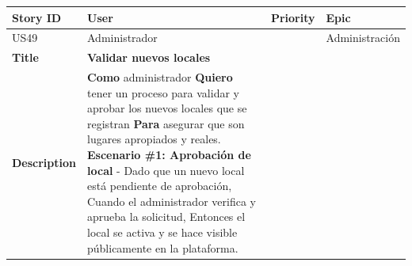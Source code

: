 {\def\LTcaptype{none} %
\begin{longtable}[]{@{}
  >{\raggedright\arraybackslash}p{}
  >{\raggedright\arraybackslash}p{}
  >{\raggedright\arraybackslash}p{}
  >{\raggedright\arraybackslash}p{}@{}}
\toprule\noalign{}
\begin{minipage}[b]{\linewidth}\raggedright
Story ID
\end{minipage} & \begin{minipage}[b]{\linewidth}\raggedright
User
\end{minipage} & \begin{minipage}[b]{\linewidth}\raggedright
Priority
\end{minipage} & \begin{minipage}[b]{\linewidth}\raggedright
Epic
\end{minipage} \\
\midrule\noalign{}
\endhead
\bottomrule\noalign{}
\endlastfoot
US49 & Administrador & 5 & Administración \\
\textbf{Title} & \textbf{Validar nuevos locales} & & \\
\textbf{Description} & \textbf{Como} administrador \textbf{Quiero} tener
un proceso para validar y aprobar los nuevos locales que se registran
\textbf{Para} asegurar que son lugares apropiados y reales.
\textbf{Escenario \#1: Aprobación de local} - Dado que un nuevo local
está pendiente de aprobación, Cuando el administrador verifica y aprueba
la solicitud, Entonces el local se activa y se hace visible públicamente
en la plataforma. & & \\
\end{longtable}
}

